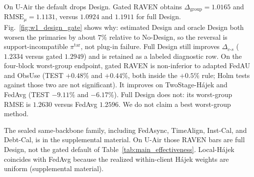 \documentclass[letterpaper,journal]{IEEEtran}
\begin{document}
On U-Air the default drops Design.  Gated RAVEN obtains
$\Delta_{\mathrm{group}}=1.0165$ and $\mathrm{RMSE}_{\mu}=1.1131$,
versus $1.0924$ and $1.1911$ for full Design.  Fig.~\ref{fig:w1_design_gate}
shows why: estimated Design and oracle Design both worsen the
primaries by about $7\%$ relative to No-Design, so the reversal is
support-incompatible $\pi^{\mathrm{tar}}$, not plug-in failure.
Full Design still improves $\Delta_{c\text{-}s}$ ($1.2334$ versus
gated $1.2949$) and is retained as a labeled diagnostic row.  On the
four-block worst-group endpoint, gated RAVEN is non-inferior to
adapted FedAU and ObsUse (TEST $+0.48\%$ and $+0.44\%$, both inside
the $+0.5\%$ rule; Holm tests against those two are not significant).
It improves on TwoStage-H\'ajek and FedAvg (TEST $-9.11\%$ and
$-6.17\%$).  Full Design does not: its worst-group RMSE is
$1.2630$ versus FedAvg $1.2596$.  We do not claim a best
worst-group method.

The sealed same-backbone family, including FedAsync, TimeAlign,
Inst-Cal, and Debt-Cal, is in the supplemental material.  On U-Air
those RAVEN bars are full Design, not the gated default of
Table~\ref{tab:main_effectiveness}.  Local-H\'ajek coincides with
FedAvg because the realized within-client H\'ajek weights are uniform
(supplemental material).
\end{document}
